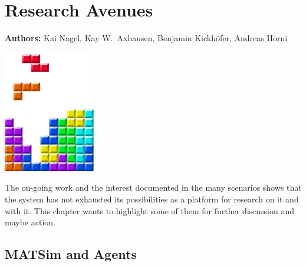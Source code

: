 \chapter{Research Avenues}
\label{ch:researchavenues}

\hfill \textbf{Authors:} Kai Nagel, Kay W.\ Axhausen, Benjamin Kickhöfer, Andreas Horni

\begin{center} \includegraphics[width=0.3\textwidth, angle=0]{frontmatter/figures/MATSimBook} \end{center}

The on-going work and the interest documented in the many scenarios shows 
that the system has not exhausted its possibilities as a platform for research on it and with it. 
This chapter wants to highlight some of them for further discussion and maybe action. 

\section{MATSim and Agents}

%
%



